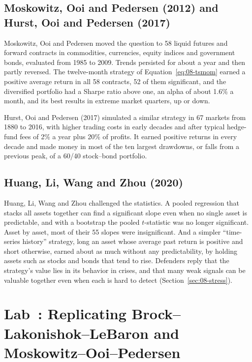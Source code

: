 \subsection{Moskowitz, Ooi and Pedersen (2012) and Hurst, Ooi and Pedersen (2017)}

Moskowitz, Ooi and Pedersen moved the question to 58 liquid futures and forward contracts in commodities, currencies, equity indices and government bonds, evaluated from 1985 to 2009. Trends persisted for about a year and then partly reversed. The twelve-month strategy of Equation~\eqref{eq:08-tsmom} earned a positive average return in all 58 contracts, 52 of them significant, and the diversified portfolio had a Sharpe ratio above one, an alpha of about 1.6\% a month, and its best results in extreme market quarters, up or down.

Hurst, Ooi and Pedersen (2017) simulated a similar strategy in 67 markets from 1880 to 2016, with higher trading costs in early decades and after typical hedge-fund fees of 2\% a year plus 20\% of profits. It earned positive returns in every decade and made money in most of the ten largest drawdowns, or falls from a previous peak, of a 60/40 stock--bond portfolio.

\subsection{Huang, Li, Wang and Zhou (2020)}

Huang, Li, Wang and Zhou challenged the statistics. A pooled regression that stacks all assets together can find a significant slope even when no single asset is predictable, and with a bootstrap the pooled $t$-statistic was no longer significant. Asset by asset, most of their 55 slopes were insignificant. And a simpler ``time-series history'' strategy, long an asset whose average past return is positive and short otherwise, earned about as much without any predictability, by holding assets such as stocks and bonds that tend to rise. Defenders reply that the strategy's value lies in its behavior in crises, and that many weak signals can be valuable together even when each is hard to detect (Section~\ref{sec:08-stress}).

\section{Lab~\thechapter: Replicating Brock--Lakonishok--LeBaron and Moskowitz--Ooi--Pedersen}
\label{sec:08-lab}

